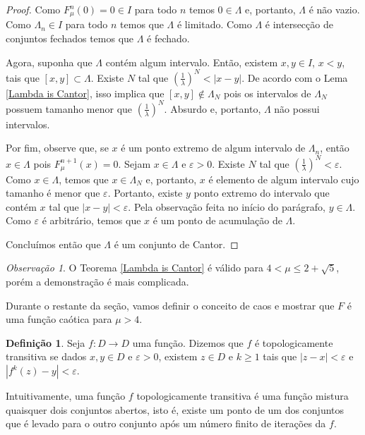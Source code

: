 \documentclass[a4paper, 12pt]{article}
\theoremstyle{definition}
\newtheorem{definition}{Definição}[section]
\theoremstyle{plain}
\theoremstyle{plain}
\theoremstyle{plain}
\theoremstyle{remark}
\newtheorem*{remark}{Observação}
\begin{document}
\begin{proof}
Como $F^n_\mu(0) = 0 \in I$ para todo $n$ temos $0 \in \Lambda$ e, portanto, $\Lambda$ é não vazio. Como $\Lambda_n \in I$ para todo $n$ temos que $\Lambda$ é limitado. Como $\Lambda$ é intersecção de conjuntos fechados  temos que $\Lambda$ é fechado.

Agora, suponha que $\Lambda$ contém algum intervalo. Então, existem $x, y \in I$, $x < y$, tais que $[x, y] \subset \Lambda$. Existe $N$ tal que $(\frac{1}{\lambda})^N < |x - y|$. De acordo com o Lema \ref{Lambda is Cantor}, isso implica que $[x, y] \notin \Lambda_N$ pois os intervalos de $\Lambda_N$ possuem tamanho menor que $(\frac{1}{\lambda})^N$. Absurdo e, portanto, $\Lambda$ não possui intervalos.

Por fim, observe que, se $x$ é um ponto extremo de algum intervalo de $\Lambda_n$, então $x \in \Lambda$ pois $F^{n+1}_\mu (x) = 0$. Sejam $x \in \Lambda$ e $\varepsilon > 0$.  Existe $N$ tal que $(\frac{1}{\lambda})^N < \varepsilon$. Como $x \in \Lambda$, temos que $x \in \Lambda_N$ e, portanto, $x$ é elemento de algum intervalo cujo tamanho é menor que $\varepsilon$. Portanto, existe $y$ ponto extremo do intervalo que contém $x$ tal que $|x - y| < \varepsilon$. Pela observação feita no início do parágrafo, $y \in \Lambda$. Como $\varepsilon$ é arbitrário, temos que $x$ é um ponto de acumulação de $\Lambda$.

Concluímos então que $\Lambda$ é um conjunto de Cantor.
\end{proof}

\begin{remark}
O Teorema \ref{Lambda is Cantor} é válido para $4 < \mu \leq 2 + \sqrt{5}$, porém a demonstração é mais complicada.
\end{remark}

Durante o restante da seção, vamos definir o conceito de caos e mostrar que $F$ é uma função caótica para $\mu > 4$.

\begin{definition}
Seja $f: D \rightarrow D$ uma função. Dizemos que $f$ é topologicamente transitiva se dados $x, y \in D$ e $\varepsilon > 0$,  existem $z \in D$ e $k \geq 1$ tais que $|z - x| < \varepsilon$ e $|f^k(z) - y| < \varepsilon$.
\end{definition} 

Intuitivamente, uma função $f$ topologicamente transitiva é uma função mistura quaisquer dois conjuntos abertos, isto é, existe um ponto de um dos conjuntos que é levado para o outro conjunto após um número finito de iterações da $f$.
\end{document}
